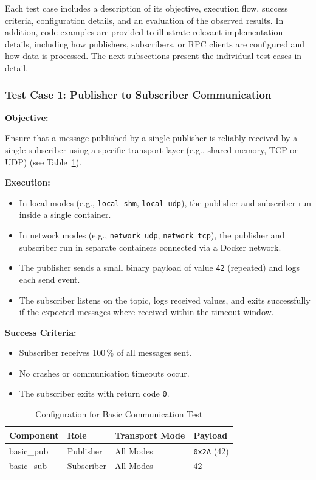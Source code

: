 Each test case includes a description of its objective, execution flow, success criteria, configuration details, and an evaluation of the observed results.  In addition, code examples are provided to illustrate relevant implementation details, including how publishers, subscribers, or RPC clients are configured and how data is processed. The next subsections present the individual test cases in detail.

\vspace{1em}
\subsubsection{Test Case 1: Publisher to Subscriber Communication}
\label{sec:tc1}
\textbf{Objective:}

\vspace{0.4em}
Ensure that a message published by a single publisher is reliably received by a single subscriber using a specific transport layer (e.g., shared memory, TCP or UDP) (see Table~\ref{tab:basic_comm_test}).

\vspace{0.5em}
\textbf{Execution:}
\begin{itemize}
	\item In local modes (e.g., \texttt{local shm}, \texttt{local udp}), the publisher and subscriber run inside a single container.
	\item In network modes (e.g., \texttt{network udp}, \texttt{network tcp}), the publisher and subscriber run in separate containers connected via a Docker network.
	\item The publisher sends a small binary payload of value \texttt{42} (repeated) and logs each send event.
	\item The subscriber listens on the topic, logs received values, and exits successfully if the expected messages where received within the timeout window.
\end{itemize}

\textbf{Success Criteria:}
\begin{itemize}
	\item Subscriber receives 100\,\% of all messages sent.
	\item No crashes or communication timeouts occur.
	\item The subscriber exits with return code \texttt{0}.
\end{itemize}

\begin{table}[H]
	\centering
	\begin{tabular}{@{}llll@{}}
		\toprule
		\textbf{Component} & \textbf{Role} & \textbf{Transport Mode} & \textbf{Payload} \\
		\midrule
		basic\_pub  & Publisher  & All Modes  & \texttt{0x2A} (42) \\
		basic\_sub  & Subscriber & All Modes  & 42 \\
		\bottomrule
	\end{tabular}
	\caption{Configuration for Basic Communication Test}
	\captionsetup{position=bottom}
	\label{tab:basic_comm_test}
\end{table}


